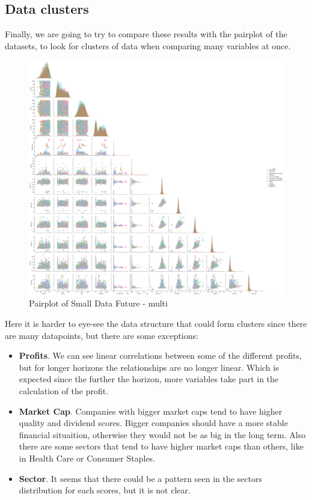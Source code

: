 \documentclass[11pt,english,a4paper,hidelinks]{book}
\begin{document}
\subsection{Data clusters}
Finally, we are going to try to compare these results with the \acrshort{pairplot} of the datasets, to look for clusters of data when comparing many variables at once.

\begin{figure}[H]
    \centering
    \includegraphics[width=1\textwidth]{images/code/descriptive analysis/correlations/Small Data future - Multi - pairplot.png}
    \caption{Pairplot of Small Data Future - \acrshort{multi}}
    \label{fig:pairplot_small_data_future_multi}
\end{figure}

\noindent Here it is harder to eye-see the data structure that could form clusters since there are many datapoints, but there are some exceptions:
\begin{itemize}
    \item \textbf{Profits}. We can see linear correlations between some of the different profits, but for longer horizons the relationships are no longer linear. Which is expected since the further the horizon, more variables take part in the calculation of the profit.
    \item \textbf{Market Cap}. Companies with bigger market caps tend to have higher quality and dividend scores. Bigger companies should have a more stable financial situaition, otherwise they would not be as big in the long term. Also there are some sectors that tend to have higher market caps than others, like in Health Care or Consumer Staples.
    \item \textbf{Sector}. It seems that there could be a pattern seen in the sectors distribution for each scores, but it is not clear.
\end{itemize}
\end{document}
